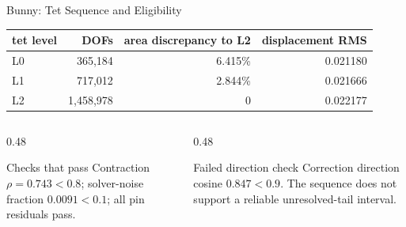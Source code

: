 \documentclass[aspectratio=169,10pt]{beamer}
\newcommand{\pct}[1]{#1\%}
\begin{document}
\begin{frame}{Bunny: Tet Sequence and Eligibility}
  \small
  \begin{table}
    \centering
    \begin{tabular}{lrrr}
      \toprule
      tet level & DOFs & area discrepancy to L2 & displacement RMS \\
      \midrule
      L0 & 365,184 & \pct{6.415} & 0.021180 \\
      L1 & 717,012 & \pct{2.844} & 0.021666 \\
      L2 & 1,458,978 & 0 & 0.022177 \\
      \bottomrule
    \end{tabular}
  \end{table}

  \vspace{0.6em}
  \begin{columns}[T]
    \begin{column}{0.48\linewidth}
      \begin{block}{Checks that pass}
        Contraction $\rho=0.743<0.8$; solver-noise fraction $0.0091<0.1$;
        all pin residuals pass.
      \end{block}
    \end{column}
    \begin{column}{0.48\linewidth}
      \begin{alertblock}{Failed direction check}
        Correction direction cosine $0.847<0.9$. The sequence does not support
        a reliable unresolved-tail interval.
      \end{alertblock}
    \end{column}
  \end{columns}
\end{frame}
\end{document}
